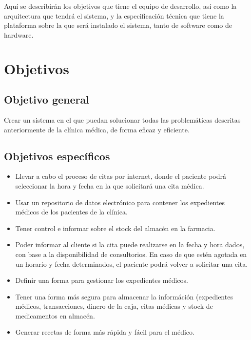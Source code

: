 Aqu\'i se describir\'an los objetivos que tiene el equipo de desarrollo, as\'i como la arquitectura que tendr\'a el sistema, y la especificaci\'on t\'ecnica que tiene la plataforma sobre la que ser\'a instalado el sistema, tanto de software como de hardware.

\section{Objetivos}

\subsection{Objetivo general}
Crear un sistema en el que puedan solucionar todas las problem\'aticas descritas anteriormente de la cl\'inica m\'edica, de forma eficaz y eficiente.


\subsection{Objetivos específicos}


\begin{itemize}
\item Llevar a cabo el proceso de citas por internet, donde el paciente podr\'a seleccionar la hora y fecha en la que solicitar\'a una cita m\'edica.
\item Usar un repositorio de datos electr\'onico para contener los expedientes m\'edicos de los pacientes de la cl\'inica.
\item Tener control e informar sobre el stock del almac\'en en la farmacia.
\item Poder informar al cliente si la cita puede realizarse en la fecha y hora dados, con base a la disponibilidad de consultorios. En
caso de que est\'en agotada en un horario y fecha determinados, el paciente podr\'a volver a solicitar una cita.
\item Definir una forma para gestionar los expedientes m\'edicos.
\item Tener una forma m\'as segura para almacenar la inform\'aci\'on (expedientes m\'edicos, transacciones, dinero de la caja, citas m\'edicas y stock de medicamentos en almac\'en.
\item Generar recetas de forma m\'as r\'apida y f\'acil para el m\'edico.

\end{itemize}
\hspace{-.50cm}
\hspace{-.50cm}


